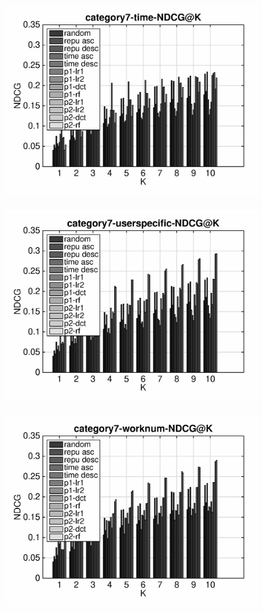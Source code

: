 \documentclass{article}
\begin{document}
\begin{figure}[ht]
\begin{flushleft}
\includegraphics[width=18cm,height=9cm]{category7-time-NDCG@K.eps}
\includegraphics[width=18cm,height=9cm]{category7-userspecific-NDCG@K.eps}
\includegraphics[width=18cm,height=9cm]{category7-worknum-NDCG@K.eps}
\end{flushleft}
\end{figure}
\end{document}
